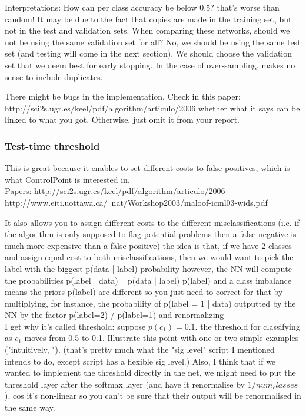 \documentclass[a4paper,11pt]{article}
\begin{document}
Interpretations:
How can per class accuracy be below 0.5? that's worse than random! It may be due to the fact that copies are made in the training set, but not in the test and validation sets. 
When comparing these networks, should we not be using the same validation set for all? No, we should be using the same test set (and testing will come in the next section). We should choose the validation set that we deem best for early stopping. In the case of over-sampling, makes no sense to include duplicates. 

There might be bugs in the implementation. Check in this paper: http://sci2s.ugr.es/keel/pdf/algorithm/articulo/2006%
whether what it says can be linked to what you got. Otherwise, just omit it from your report. \\


\subsubsection{Test-time threshold}

This is great because it enables to set different costs to false positives, which is what ControlPoint is interested in. \\

Papers: 
http://sci2s.ugr.es/keel/pdf/algorithm/articulo/2006%
http://www.eiti.uottawa.ca/~nat/Workshop2003/maloof-icml03-wids.pdf

It also allows you to assign different costs to the different misclassifications (i.e. if the algorithm is only supposed to flag potential problems then a false negative is much more expensive than a false positive)
the idea is that, if we have 2 classes and assign equal cost to both misclassifications, then we would want to pick the label with the biggest p(data | label) probability
however, the NN will compute the probabilities p(label | data) ~ p(data | label) p(label)
and a class imbalance means the priors p(label) are different
so you just need to correct for that by multiplying, for instance, the probability of p(label = 1 | data) outputted by the NN by the factor p(label=2) / p(label=1) and renormalizing \\

I get why it's called threshold: suppose $p(c_1)=0.1$. the threshold for classifying as $c_1$ moves from 0.5 to 0.1. Illustrate this point with one or two simple examples ("intuitively, ").  (that's pretty much what the "sig level" script I mentioned intends to do, except script has a flexible sig level.)
Also, I think that if we wanted to implement the threshold directly in the net, we might need to put the threshold layer after the softmax layer (and have it renormalise by $1/num_classes$). cos it's non-linear so you can't be sure that their output will be renormalised in the same way. \\
\end{document}
